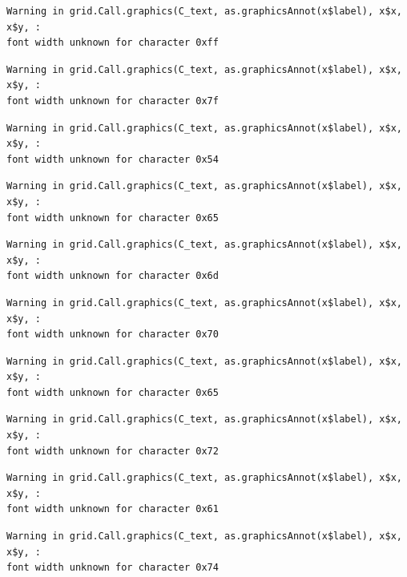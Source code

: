 \documentclass[
  letterpaper,
]{scrbook}
\begin{document}
\begin{verbatim}
Warning in grid.Call.graphics(C_text, as.graphicsAnnot(x$label), x$x, x$y, :
font width unknown for character 0xff
\end{verbatim}

\begin{verbatim}
Warning in grid.Call.graphics(C_text, as.graphicsAnnot(x$label), x$x, x$y, :
font width unknown for character 0x7f
\end{verbatim}

\begin{verbatim}
Warning in grid.Call.graphics(C_text, as.graphicsAnnot(x$label), x$x, x$y, :
font width unknown for character 0x54
\end{verbatim}

\begin{verbatim}
Warning in grid.Call.graphics(C_text, as.graphicsAnnot(x$label), x$x, x$y, :
font width unknown for character 0x65
\end{verbatim}

\begin{verbatim}
Warning in grid.Call.graphics(C_text, as.graphicsAnnot(x$label), x$x, x$y, :
font width unknown for character 0x6d
\end{verbatim}

\begin{verbatim}
Warning in grid.Call.graphics(C_text, as.graphicsAnnot(x$label), x$x, x$y, :
font width unknown for character 0x70
\end{verbatim}

\begin{verbatim}
Warning in grid.Call.graphics(C_text, as.graphicsAnnot(x$label), x$x, x$y, :
font width unknown for character 0x65
\end{verbatim}

\begin{verbatim}
Warning in grid.Call.graphics(C_text, as.graphicsAnnot(x$label), x$x, x$y, :
font width unknown for character 0x72
\end{verbatim}

\begin{verbatim}
Warning in grid.Call.graphics(C_text, as.graphicsAnnot(x$label), x$x, x$y, :
font width unknown for character 0x61
\end{verbatim}

\begin{verbatim}
Warning in grid.Call.graphics(C_text, as.graphicsAnnot(x$label), x$x, x$y, :
font width unknown for character 0x74
\end{verbatim}
\end{document}
